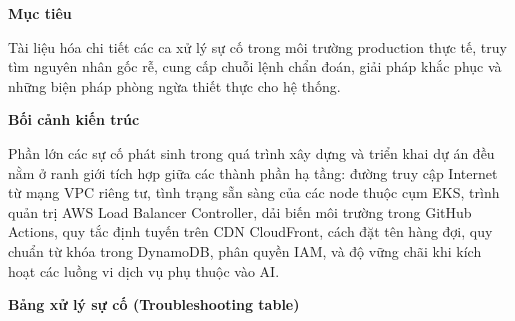\vspace{0.5em}\noindent\textbf{Mục tiêu}\par

Tài liệu hóa chi tiết các ca xử lý sự cố trong môi trường production
thực tế, truy tìm nguyên nhân gốc rễ, cung cấp chuỗi lệnh chẩn đoán,
giải pháp khắc phục và những biện pháp phòng ngừa thiết thực cho hệ
thống.

\vspace{0.5em}\noindent\textbf{Bối cảnh kiến
trúc}\par

Phần lớn các sự cố phát sinh trong quá trình xây dựng và triển khai dự
án đều nằm ở ranh giới tích hợp giữa các thành phần hạ tầng: đường truy
cập Internet từ mạng VPC riêng tư, tình trạng sẵn sàng của các node
thuộc cụm EKS, trình quản trị AWS Load Balancer Controller, dải biến môi
trường trong GitHub Actions, quy tắc định tuyến trên CDN CloudFront,
cách đặt tên hàng đợi, quy chuẩn từ khóa trong DynamoDB, phân quyền IAM,
và độ vững chãi khi kích hoạt các luồng vi dịch vụ phụ thuộc vào AI.

\vspace{0.5em}\noindent\textbf{Bảng xử lý sự cố (Troubleshooting
table)}\par


